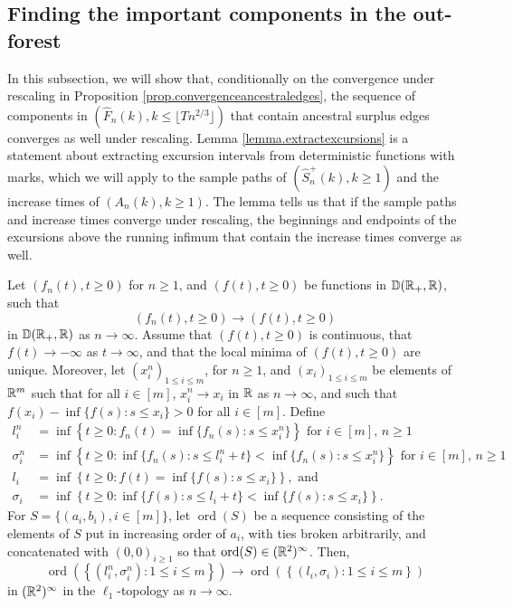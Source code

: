 \subsection{Finding the important components in the out-forest}\label{subsec.componentswithancestral}
In this subsection, we will show that, conditionally on the convergence under rescaling in Proposition \ref{prop.convergenceancestraledges}, the sequence of components in $(\hat{F}_n(k),k\leq \lfloor T n^{2/3}\rfloor )$ that contain ancestral surplus edges converges as well under rescaling. Lemma \ref{lemma.extractexcursions} is a statement about extracting excursion intervals from deterministic functions with marks, which we will apply to the sample paths of $(\hat{S}_n^{+}(k),k\geq 1)$ and the increase times of $(A_n(k),k\geq 1)$. The lemma tells us that if the sample paths and increase times converge under rescaling, the beginnings and endpoints of the excursions above the running infimum that contain the increase times converge as well. 
\begin{lemma}\label{lemma.extractexcursions}
Let $(f_n(t), t\geq 0)$ for $n\geq 1$, and $(f(t),t\geq 0)$ be functions in ${\mathbb D}({\mathbb R}_+,{\mathbb R})$, such that 
$$(f_n(t), t\geq 0)\to (f(t),t\geq 0)$$ in ${\mathbb D}({\mathbb R}_+,{\mathbb R})$ as $n\to \infty$. Assume that $(f(t),t\geq 0)$ is continuous, that $f(t)\to -\infty$ as $t\to \infty$, and that the local minima of $(f(t),t\geq 0)$ are unique. Moreover, let $(x_i^n)_{1\leq i\leq m}$, for $n\geq 1$, and $(x_i)_{1\leq i\leq m}$ be elements of ${\mathbb R}^{m}$ such that for all $i\in [m]$, $x_i^n\to x_i$ in ${\mathbb R}$ as $n\to \infty$, and such that $f(x_i)-\inf\{f(s):s\leq x_i\}>0$ for all $i\in [m]$. Define
\begin{align*}l_i^n&=\inf\left\{t\geq 0:f_n(t)=\inf\{f_n(s):s\leq x_i^n\}\right\}\text{ for }i\in [m]\text{, }n\geq 1\\
\sigma_i^n&=\inf\left\{ t\geq 0: \inf\{f_n(s):s\leq l_i^n+t\} < \inf\{f_n(s):s\leq x_i^n\}\right\}\text{ for }i\in [m]\text{, }n\geq 1\\
l_i&=\inf\left\{t\geq 0:f(t)=\inf\{f(s):s\leq x_i\}\right\},\text{ and}\\
\sigma_i&=\inf\left\{ t\geq 0: \inf\{f(s):s\leq l_i+ t\} < \inf\{f(s):s\leq x_i\}\right\}.
\end{align*}
For $S=\{(a_i,b_i), i\in [m]\}$, let $\operatorname{ord}(S)$ be a sequence consisting of the elements of $S$ put in increasing order of $a_i$, with ties broken arbitrarily, and concatenated with $(0,0)_{i\geq 1}$ so that $\operatorname{ord}(S)\in ({\mathbb R}^2)^\infty$. Then, 
$$\operatorname{ord}\left(\left\{(l_i^n,\sigma_i^n):1\leq i \leq m\right\}\right)\to \operatorname{ord}\left(\left\{(l_i,\sigma_i):1\leq i \leq m\right\}\right)$$
in $({\mathbb R}^{2})^\infty$ in the $\ell_1$-topology as $n\to \infty$. 
\end{lemma}

